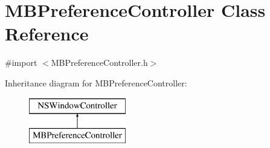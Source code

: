 \hypertarget{interface_m_b_preference_controller}{\section{M\-B\-Preference\-Controller Class Reference}
\label{interface_m_b_preference_controller}
}


{\ttfamily \#import $<$M\-B\-Preference\-Controller.\-h$>$}

Inheritance diagram for M\-B\-Preference\-Controller\-:\begin{figure}[H]
\begin{center}
\leavevmode
\includegraphics[height=2.000000cm]{interface_m_b_preference_controller}
\end{center}
\end{figure}
